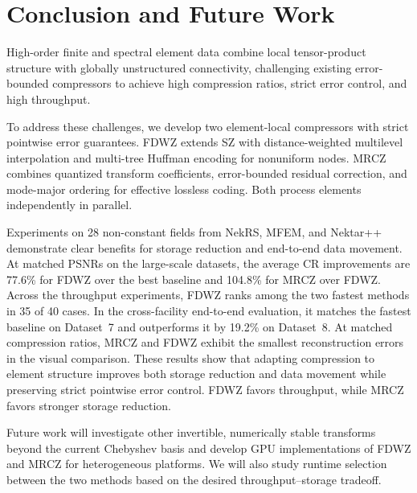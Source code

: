 \section{Conclusion and Future Work}\label{sec:conclusion}

High-order finite and spectral element data combine local tensor-product structure with globally unstructured connectivity, challenging existing error-bounded compressors to achieve high compression ratios, strict error control, and high throughput.

To address these challenges, we develop two element-local compressors with strict pointwise error guarantees. FDWZ extends SZ with distance-weighted multilevel interpolation and multi-tree Huffman encoding for nonuniform nodes. MRCZ combines quantized transform coefficients, error-bounded residual correction, and mode-major ordering for effective lossless coding. Both process elements independently in parallel.

Experiments on 28 non-constant fields from NekRS, MFEM, and Nektar++ demonstrate clear benefits for storage reduction and end-to-end data movement. At matched PSNRs on the large-scale datasets, the average CR improvements are 77.6\% for FDWZ over the best baseline and 104.8\% for MRCZ over FDWZ. Across the throughput experiments, FDWZ ranks among the two fastest methods in 35 of 40 cases. In the cross-facility end-to-end evaluation, it matches the fastest baseline on Dataset~7 and outperforms it by 19.2\% on Dataset~8. At matched compression ratios, MRCZ and FDWZ exhibit the smallest reconstruction errors in the visual comparison. These results show that adapting compression to element structure improves both storage reduction and data movement while preserving strict pointwise error control. FDWZ favors throughput, while MRCZ favors stronger storage reduction.

Future work will investigate other invertible, numerically stable transforms beyond the current Chebyshev basis and develop GPU implementations of FDWZ and MRCZ for heterogeneous platforms. We will also study runtime selection between the two methods based on the desired throughput--storage tradeoff.
